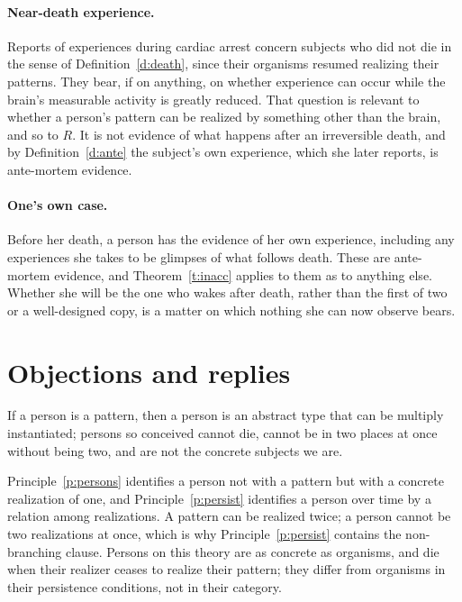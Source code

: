 \documentclass{situationist-preprint}
\begin{document}
\paragraph{Near-death experience.} Reports of experiences during cardiac arrest \citep{vanLommel2001} concern subjects who did not die in the sense of Definition~\ref{d:death}, since their organisms resumed realizing their patterns. They bear, if on anything, on whether experience can occur while the brain's measurable activity is greatly reduced. That question is relevant to whether a person's pattern can be realized by something other than the brain, and so to $R$. It is not evidence of what happens after an irreversible death, and by Definition~\ref{d:ante} the subject's own experience, which she later reports, is ante-mortem evidence.

\paragraph{One's own case.} Before her death, a person has the evidence of her own experience, including any experiences she takes to be glimpses of what follows death. These are ante-mortem evidence, and Theorem~\ref{t:inacc} applies to them as to anything else. Whether she will be the one who wakes after death, rather than the first of two or a well-designed copy, is a matter on which nothing she can now observe bears.

\section{Objections and replies}

\begin{objection}\label{o:types}
If a person is a pattern, then a person is an abstract type that can be multiply instantiated; persons so conceived cannot die, cannot be in two places at once without being two, and are not the concrete subjects we are.
\end{objection}

\begin{reply}
Principle~\ref{p:persons} identifies a person not with a pattern but with a concrete realization of one, and Principle~\ref{p:persist} identifies a person over time by a relation among realizations. A pattern can be realized twice; a person cannot be two realizations at once, which is why Principle~\ref{p:persist} contains the non-branching clause. Persons on this theory are as concrete as organisms, and die when their realizer ceases to realize their pattern; they differ from organisms in their persistence conditions, not in their category.
\end{reply}
\end{document}
